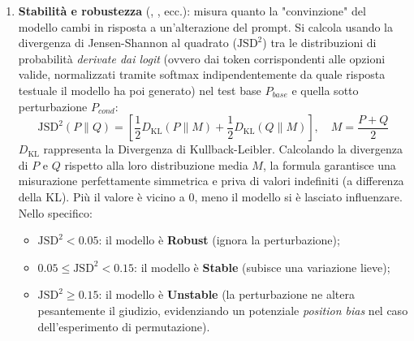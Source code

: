 \documentclass[../relazione.tex]{subfiles}
\begin{document}
\begin{enumerate}
    \item \textbf{Stabilità e robustezza} (, , ecc.): misura quanto la "convinzione" del modello cambi in risposta a un'alterazione del prompt. Si calcola usando la divergenza di Jensen-Shannon al quadrato ($\text{JSD}^2$) tra le distribuzioni di probabilità \emph{derivate dai logit} (ovvero dai token corrispondenti alle opzioni valide, normalizzati tramite softmax indipendentemente da quale risposta testuale il modello ha poi generato) nel test base $P_{base}$ e quella sotto perturbazione $P_{cond}$:
    $$\text{JSD}^2(P \| Q) = \left[\frac{1}{2} D_{\text{KL}}(P \| M) + \frac{1}{2} D_{\text{KL}}(Q \| M)\right], \quad M = \frac{P+Q}{2}$$
    $D_{\text{KL}}$ rappresenta la Divergenza di Kullback-Leibler. Calcolando la divergenza di $P$ e $Q$ rispetto alla loro distribuzione media $M$, la formula garantisce una misurazione perfettamente simmetrica e priva di valori indefiniti (a differenza della KL). Più il valore è vicino a 0, meno il modello si è lasciato influenzare. Nello specifico:
    \begin{itemize}
        \item $\text{JSD}^2 < 0.05$: il modello è \textbf{Robust} (ignora la perturbazione);
        \item $0.05 \leq \text{JSD}^2 < 0.15$: il modello è \textbf{Stable} (subisce una variazione lieve);
        \item $\text{JSD}^2 \geq 0.15$: il modello è \textbf{Unstable} (la perturbazione ne altera pesantemente il giudizio, evidenziando un potenziale \emph{position bias} nel caso dell'esperimento di permutazione).
    \end{itemize}  


\end{enumerate}
\end{document}
